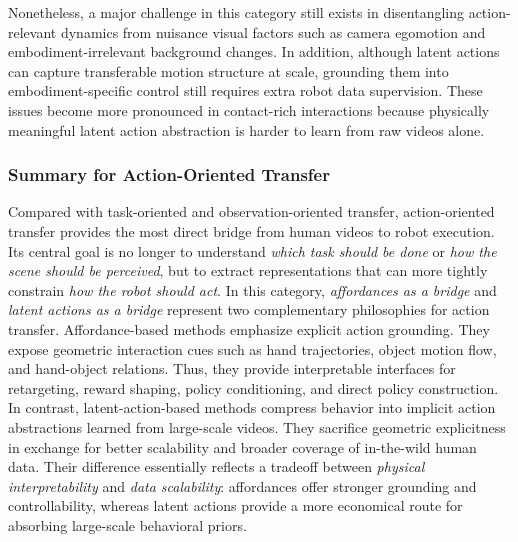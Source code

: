 \documentclass[Afour,sageh,times]{sagej}
\begin{document}
Nonetheless, a major challenge in this category still exists in disentangling action-relevant dynamics from nuisance visual factors such as camera egomotion and embodiment-irrelevant background changes. In addition, although latent actions can capture transferable motion structure at scale, grounding them into embodiment-specific control still requires extra robot data supervision. These issues become more pronounced in contact-rich interactions because physically meaningful latent action abstraction is harder to learn from raw videos alone.








\subsubsection{Summary for Action-Oriented Transfer}

Compared with task-oriented and observation-oriented transfer, action-oriented transfer provides the most direct bridge from human videos to robot execution. Its central goal is no longer to understand \textit{which task should be done} or \textit{how the scene should be perceived}, but to extract representations that can more tightly constrain \textit{how the robot should act}. In this category, \textit{affordances as a bridge} and \textit{latent actions as a bridge} represent two complementary philosophies for action transfer. Affordance-based methods emphasize explicit action grounding. They expose geometric interaction cues such as hand trajectories, object motion flow, and hand-object relations. Thus, they provide interpretable interfaces for retargeting, reward shaping, policy conditioning, and direct policy construction. In contrast, latent-action-based methods compress behavior into implicit action abstractions learned from large-scale videos. They sacrifice geometric explicitness in exchange for better scalability and broader coverage of in-the-wild human data. Their difference essentially reflects a tradeoff between \textit{physical interpretability} and \textit{data scalability}: affordances offer stronger grounding and controllability, whereas latent actions provide a more economical route for absorbing large-scale behavioral priors.
\end{document}
